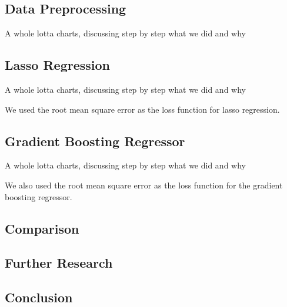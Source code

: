 \subsection{Data Preprocessing}
A whole lotta charts, discussing step by step what we did and why
\subsection{Lasso Regression}
A whole lotta charts, discussing step by step what we did and why

We used the root mean square error as the loss function for lasso regression.
\subsection{Gradient Boosting Regressor}
A whole lotta charts, discussing step by step what we did and why

We also used the root mean square error as the loss function for the gradient boosting regressor.
\subsection{Comparison}

\subsection{Further Research}
\subsection{Conclusion}
